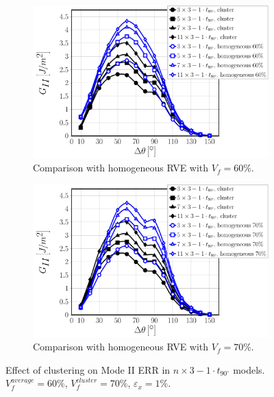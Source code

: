 \documentclass[review]{elsarticle}
\begin{document}
\begin{figure}[!h]
\centering
    \begin{subfigure}[b]{0.475\textwidth}
        \includegraphics[width=\textwidth]{nx1-1t90-vf60-GII.pdf}
        \caption{Comparison with homogeneous RVE with $V_{f}=60\%$.}\label{subfig:cluster1t90nx3ModeII60}
    \end{subfigure}\quad
    \begin{subfigure}[b]{0.475\textwidth}
        \includegraphics[width=\textwidth]{nx1-1t90-vf70-GII.pdf}
        \caption{Comparison with homogeneous RVE with $V_{f}=70\%$.}\label{subfig:cluster1t90nx3ModeII70}
    \end{subfigure}

\caption{Effect of clustering on Mode II ERR in $n\times 3-1\cdot t_{90^{\circ}}$ models. $V^{average}_{f}=60\%$, $V^{cluster}_{f}=70\%$, $\varepsilon_{x}=1\%$.}\label{fig:cluster1t90nx3ModeII}
\end{figure}
\end{document}
